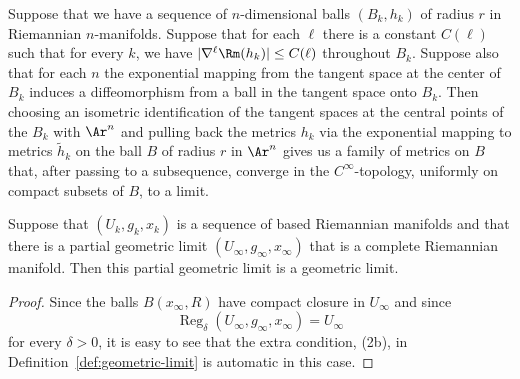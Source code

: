 \begin{lemma}\label{lem:gaussian-coordinates-convergence}
\notready
Suppose that we have a sequence of $n$-dimensional balls $(B_k,h_k)$
of radius $r$ in Riemannian $n$-manifolds. Suppose that for each
$\ell$ there is a constant $C(\ell)$ such that for every $k$, we
have $|\nabla ^\ell \Rm(h_k)|\le C(\ell)$ throughout $B_k$.
Suppose also that for each $n$ the exponential mapping from the
tangent space at the center of $B_k$ induces a diffeomorphism from a
ball in the tangent space onto $B_k$. Then choosing an isometric
identification of the tangent spaces at the central points of the
$B_k$ with $\Ar^n$ and pulling back the metrics $h_k$ via the
exponential mapping to metrics $\tilde h_k$ on the ball $B$ of
radius $r$ in $\Ar^n$ gives us a family of metrics on $B$ that,
after passing to a subsequence, converge in the $C^\infty$-topology,
uniformly on compact subsets of $B$, to a limit.
\end{lemma}

\begin{lemma}\label{lem:partial-limit-complete-is-limit}
\notready

Suppose that $(U_k,g_k,x_k)$ is a sequence of based Riemannian
manifolds and that there is a partial geometric limit
$(U_\infty,g_\infty,x_\infty)$ that is a complete Riemannian
manifold. Then this partial geometric limit is a geometric limit.
\end{lemma}




\begin{proof}
\sketch
{}
Since the balls $B(x_\infty,R)$ have compact closure in $U_\infty$
and since
$$\operatorname{Reg}_\delta(U_\infty,g_\infty,x_\infty)=U_\infty$$ for
every $\delta>0$, it is easy to see that the extra condition, (2b), in
Definition~\ref{def:geometric-limit} is automatic in this case.
\end{proof}

